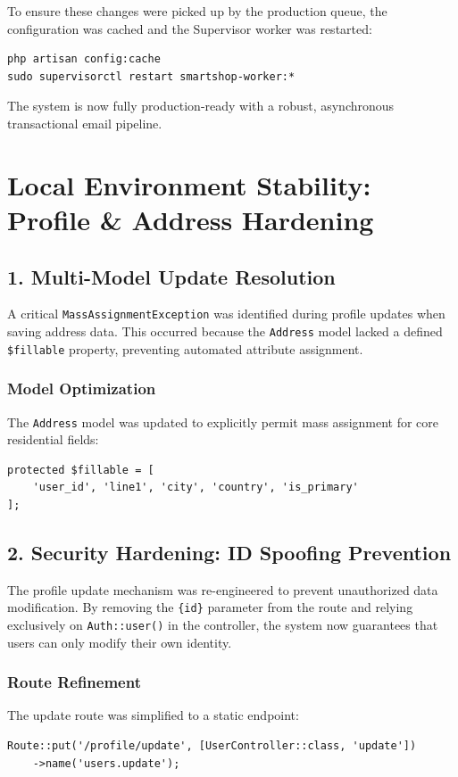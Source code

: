 \documentclass[12pt,a4paper]{article}
\begin{document}
To ensure these changes were picked up by the production queue, the configuration was cached and the Supervisor worker was restarted:

\begin{verbatim}
php artisan config:cache
sudo supervisorctl restart smartshop-worker:*
\end{verbatim}

The system is now fully production-ready with a robust, asynchronous transactional email pipeline.

\section{Local Environment Stability: Profile \& Address Hardening}

\subsection{1. Multi-Model Update Resolution}

A critical \texttt{MassAssignmentException} was identified during profile updates when saving address data. This occurred because the \texttt{Address} model lacked a defined \texttt{\$fillable} property, preventing automated attribute assignment.

\subsubsection{Model Optimization}
The \texttt{Address} model was updated to explicitly permit mass assignment for core residential fields:
\begin{verbatim}
protected $fillable = [
    'user_id', 'line1', 'city', 'country', 'is_primary'
];
\end{verbatim}

\subsection{2. Security Hardening: ID Spoofing Prevention}

The profile update mechanism was re-engineered to prevent unauthorized data modification. By removing the \texttt{\{id\}} parameter from the route and relying exclusively on \texttt{Auth::user()} in the controller, the system now guarantees that users can only modify their own identity.

\subsubsection{Route Refinement}
The update route was simplified to a static endpoint:
\begin{verbatim}
Route::put('/profile/update', [UserController::class, 'update'])
    ->name('users.update');
\end{verbatim}
\end{document}
